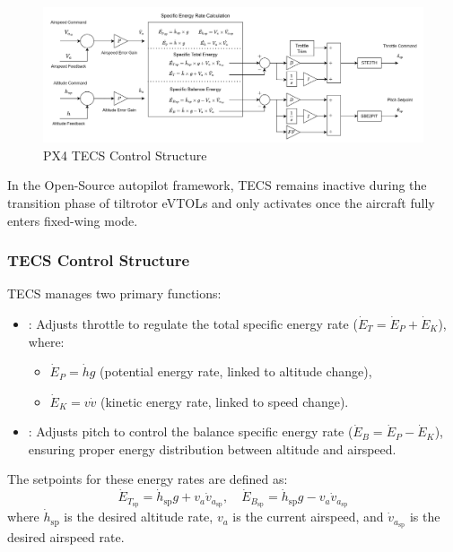 \documentclass[journal,article,submit,pdftex,moreauthors]{Definitions/mdpi}
\begin{document}
\begin{figure}[H]
    \centering
    \includegraphics[width=1\linewidth]{PX4_TECS_Structure.png}
    \caption{PX4 TECS Control Structure}
    \label{fig:enter-label}
\end{figure}
In the Open-Source autopilot framework, TECS remains inactive during the transition phase of tiltrotor eVTOLs and only activates once the aircraft fully enters fixed-wing mode.

\subsubsection{TECS Control Structure}
TECS manages two primary functions:
\begin{itemize}
    \item {}: Adjusts throttle to regulate the total specific energy rate (\(\dot{E}_T = \dot{E}_P + \dot{E}_K\)), where:
    \begin{itemize}
        \item \(\dot{E}_P = \dot{h}g\) (potential energy rate, linked to altitude change),
        \item \(\dot{E}_K = v\dot{v}\) (kinetic energy rate, linked to speed change).
    \end{itemize}
    \item {}: Adjusts pitch to control the balance specific energy rate (\(\dot{E}_B = \dot{E}_P - \dot{E}_K\)), ensuring proper energy distribution between altitude and airspeed.
\end{itemize}

The setpoints for these energy rates are defined as:
\begin{equation}
    \dot{E}_{T_{\text{sp}}} = \dot{h}_{\text{sp}}g + v_a\dot{v}_{a_{\text{sp}}}, \quad \dot{E}_{B_{\text{sp}}} = \dot{h}_{\text{sp}}g - v_a\dot{v}_{a_{\text{sp}}}
\end{equation}
where \(\dot{h}_{\text{sp}}\) is the desired altitude rate, \(v_a\) is the current airspeed, and \(\dot{v}_{a_{\text{sp}}}\) is the desired airspeed rate.
\end{document}
